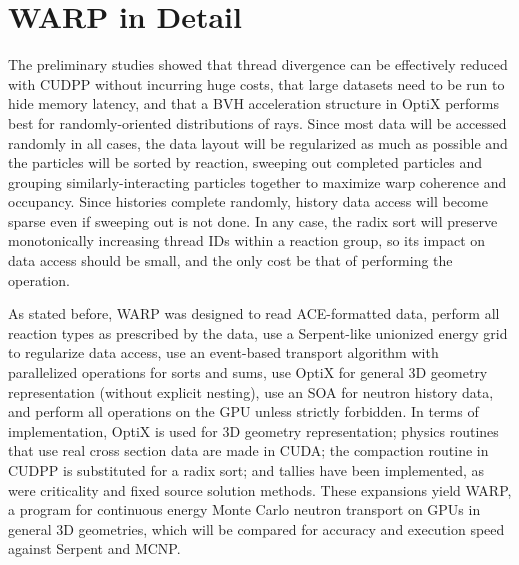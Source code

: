 \section{WARP in Detail}

The preliminary studies showed that thread divergence can be effectively reduced with CUDPP without incurring huge costs, that large datasets need to be run to hide memory latency, and that a BVH acceleration structure in OptiX performs best for randomly-oriented distributions of rays.  Since most data will be accessed randomly in all cases, the data layout will be regularized as much as possible and the particles will be sorted by reaction, sweeping out completed particles and grouping similarly-interacting particles together to maximize warp coherence and occupancy. 
 Since histories complete randomly, history data access will become sparse even if sweeping out is not done. %
 In any case, the radix sort%
 will preserve monotonically increasing thread IDs within a reaction group, so its impact on data access should be small, and the only cost be that of performing the operation.

As stated before, WARP was designed to read ACE-formatted data, perform all reaction types as prescribed by the data, use a Serpent-like unionized energy grid to regularize data access, use an event-based transport algorithm with parallelized operations for sorts and sums, use OptiX for general 3D geometry representation (without explicit nesting), use an SOA for neutron history data, and perform all operations on the GPU unless strictly forbidden.  In terms of implementation, OptiX is used for 3D geometry representation; physics routines that use real cross section data are made in CUDA; the compaction routine in CUDPP is substituted for a radix sort; and tallies have been implemented, as were criticality and fixed source solution methods.  These expansions yield WARP, a program for continuous energy Monte Carlo neutron transport on GPUs in general 3D geometries, which will be compared for accuracy and execution speed against Serpent and MCNP.

